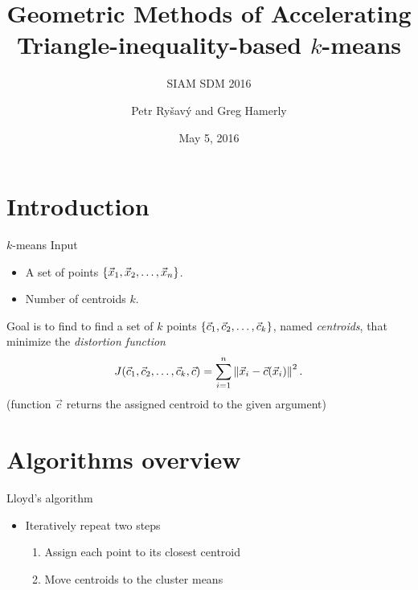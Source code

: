 \documentclass[10pt, compress]{beamer}
\title{Geometric Methods of Accelerating Triangle-inequality-based \texorpdfstring{$k$}{k}-means}
\subtitle{SIAM SDM 2016}
\date{May 5, 2016}
\author{Petr Ry\v{s}av\'{y} and Greg Hamerly}
\institute{Baylor University, Waco, TX, USA}
\begin{document}
\maketitle

\section{Introduction}


\begin{frame}{\texorpdfstring{$k$}{k}-means}
  Input
  \begin{itemize}
    \item A set of points $\left\{ {\vec{x}}_1, {\vec{x}}_2, \ldots, {\vec{x}}_{n} \right\}$.
    \item Number of centroids $k$.
  \end{itemize}
  Goal is to find to find a set of $k$ points $\left\{ {\vec{c}}_1, {\vec{c}}_2, \ldots, {\vec{c}}_{k} \right\}$, named \emph{centroids},
  that minimize the \emph{distortion function}
  \begin{equation*}
    J({\vec{c}}_1, {\vec{c}}_2, \ldots, {\vec{c}}_{k}, \vec{c}) = \sum_{i=1}^n \left\| \vec{x}_i - \vec{c}(\vec{x}_i) \right\|^2.
    \label{eq:distortion}
  \end{equation*}
  (function $\vec{c}$ returns the assigned centroid to the given argument)
\end{frame}

%  

\section{Algorithms overview}

\begin{frame}{Lloyd's algorithm}
  \begin{itemize}
     \item Iteratively repeat two steps
     \begin{enumerate}
       \item Assign each point to its closest centroid
       \item Move centroids to the cluster means
     \end{enumerate}
  \end{itemize}
\end{frame}
\end{document}
